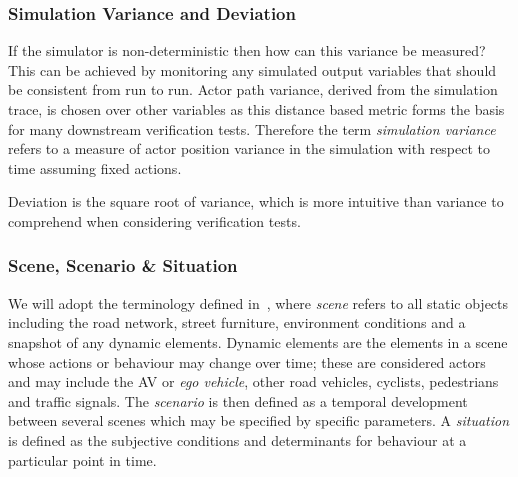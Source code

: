 \documentclass[letterpaper, 10 pt, journal, twoside]{IEEEtran}
\begin{document}
\subsubsection{Simulation Variance and Deviation}
If the simulator is non-deterministic then how can this variance be measured? 
%
This can be achieved by monitoring any simulated output variables that should be consistent from run to run. 
Actor path variance, derived from the simulation trace, is chosen over other variables as this distance based metric forms the basis for many downstream verification tests.%
% 
Therefore the term \textit{simulation variance} refers to a measure of actor position variance in the simulation with respect to time assuming fixed actions. 

Deviation is the square root of variance, which is more intuitive than variance to comprehend when considering verification tests.


\subsubsection{Scene, Scenario \& Situation}
We will adopt the terminology defined in~\cite{Ulbrich2015}, where \textit{scene} refers to all static objects including the road network, street furniture, environment conditions and a snapshot of any dynamic elements. Dynamic elements are the elements in a scene whose actions or behaviour may change over time; these are considered actors and may include the AV or \textit{ego vehicle}, other road vehicles, cyclists, pedestrians and traffic signals. The \textit{scenario} is then defined as a temporal development between several scenes which may be specified by specific parameters. A \textit{situation} is defined as the subjective conditions and determinants for behaviour at a particular point in time.
\end{document}
